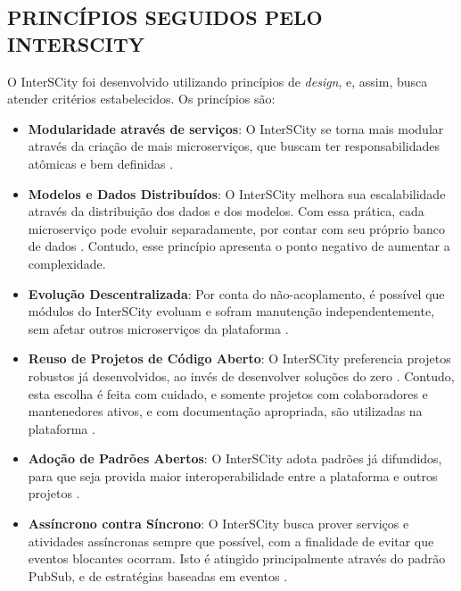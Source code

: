 \begin{apendicesenv}
%
\partapendices
%
\chapter{PRINCÍPIOS SEGUIDOS PELO INTERSCITY}
\label{appendix:principles}

O InterSCity foi desenvolvido utilizando princípios de \textit{design}, e,
assim, busca atender critérios estabelecidos. Os princípios são:

\begin{itemize}
    \item \textbf{Modularidade através de serviços}: O InterSCity se torna mais
modular através da criação de mais microserviços, que buscam ter
responsabilidades atômicas e bem definidas \cite{delesposte2017}.

    \item \textbf{Modelos e Dados Distribuídos}: O InterSCity melhora sua
escalabilidade através da distribuição dos dados e dos modelos. Com essa
prática, cada microserviço pode evoluir separadamente, por contar com seu
próprio banco de dados \cite{delesposte2017}. Contudo, esse princípio apresenta
o ponto negativo de aumentar a complexidade.

    \item \textbf{Evolução Descentralizada}: Por conta do não-acoplamento, é
possível que módulos do InterSCity evoluam e sofram manutenção
independentemente, sem afetar outros microserviços da plataforma
\cite{delesposte2017}.

    \item \textbf{Reuso de Projetos de Código Aberto}: O InterSCity preferencia %
projetos robustos já desenvolvidos, ao invés de desenvolver soluções do zero
\cite{delesposte2017}. Contudo, esta escolha é feita com cuidado, e somente
projetos com colaboradores e mantenedores ativos, e com documentação
apropriada, são utilizadas na plataforma \cite{delesposte2017}.

    \item \textbf{Adoção de Padrões Abertos}: O InterSCity adota padrões já
difundidos, para que seja provida maior interoperabilidade entre a plataforma
e outros projetos \cite{delesposte2017}.

    \item \textbf{Assíncrono contra Síncrono}: O InterSCity busca prover
serviços e atividades assíncronas sempre que possível, com a finalidade de
evitar que eventos blocantes ocorram. Isto é atingido principalmente através
do padrão PubSub, e de estratégias baseadas em eventos \cite{delesposte2017}.


\end{itemize}
\end{apendicesenv}
